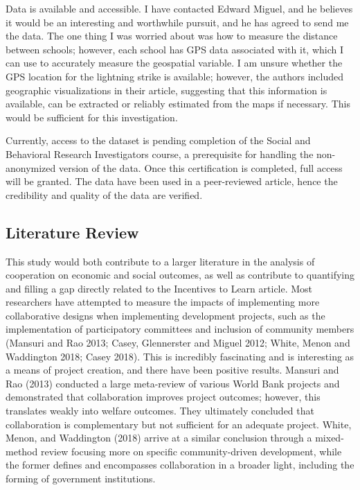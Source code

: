 \documentclass{article}
\begin{document}
Data is available and accessible. I have contacted Edward Miguel, and he believes it would be an interesting and worthwhile pursuit, and he has agreed to send me the data. The one thing I was worried about was how to measure the distance between schools; however, each school has GPS data associated with it, which I can use to accurately measure the geospatial variable. I am unsure whether the GPS location for the lightning strike is available; however, the authors included geographic visualizations in their article, suggesting that this information is available, can be extracted or reliably estimated from the maps if necessary. This would be sufficient for this investigation. 

Currently, access to the dataset is pending completion of the Social and Behavioral Research Investigators course, a prerequisite for handling the non-anonymized version of the data. Once this certification is completed, full access will be granted. The data have been used in a peer-reviewed article, hence the credibility and quality of the data are verified. 


\subsection{Literature Review}
This study would both contribute to a larger literature in the analysis of cooperation on economic and social outcomes, as well as contribute to quantifying and filling a gap directly related to the Incentives to Learn article. Most researchers have attempted to measure the impacts of implementing more collaborative designs when implementing development projects, such as the implementation of participatory committees and inclusion of community members (Mansuri and Rao 2013; Casey, Glennerster and Miguel 2012; White, Menon and Waddington 2018; Casey 2018).\autocites{mansuri-rao-2013}{casey-glennerster-miguel-2012}{white-menon-waddington-2018}{casey-2018-annrev} This is incredibly fascinating and is interesting as a means of project creation, and there have been positive results. Mansuri and Rao (2013) conducted a large meta-review of various World Bank projects and demonstrated that collaboration improves project outcomes; however, this translates weakly into welfare outcomes.\autocite[see esp.~ch.~2]{mansuri-rao-2013} They ultimately concluded that collaboration is complementary but not sufficient for an adequate project. White, Menon, and Waddington (2018) arrive at a similar conclusion through a mixed-method review focusing more on specific community-driven development, while the former defines and encompasses collaboration in a broader light, including the forming of government institutions. \autocite[]{white-menon-waddington-2018} 
\end{document}

